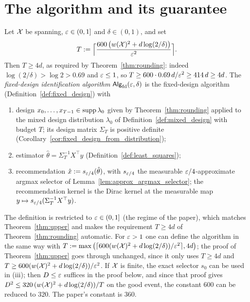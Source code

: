 \section{The algorithm and its guarantee}
\label{sec:upper_theorem}

\begin{definition}\label{def:fixed_design_algorithm}
\leanok
{}
Let $\mathcal{X}$ be spanning, $\varepsilon \in (0,1]$ and $\delta \in (0,1)$, and set
\[
  T := \Big\lceil \frac{600\,\big(w(\mathcal{X})^2 + d\log(2/\delta)\big)}{\varepsilon^2} \Big\rceil .
\]
Then $T \ge 4d$, as required by Theorem~\ref{thm:rounding}: indeed $\log(2/\delta) > \log 2 > 0.69$
and $\varepsilon \le 1$, so $T \ge 600\cdot0.69\,d/\varepsilon^2 \ge 414\,d \ge 4d$.
The \emph{fixed-design identification algorithm} $\mathsf{Alg}_{\mathrm{fd}}(\varepsilon,\delta)$
is the fixed-design algorithm (Definition~\ref{def:fixed_design}) with
\begin{enumerate}
  \item[(i)] design $x_0,\dots,x_{T-1} \in \operatorname{supp}\lambda_0$ given by Theorem~\ref{thm:rounding}
        applied to the mixed design distribution $\lambda_0$ of Definition~\ref{def:mixed_design}
        with budget $T$; its design matrix $\Sigma_T$ is positive definite
        (Corollary~\ref{cor:fixed_design_from_distribution});
  \item[(ii)] estimator $\hat\theta = \Sigma_T^{-1}X^\top y$ (Definition~\ref{def:least_squares});
  \item[(iii)] recommendation $\hat{x} := s_{\varepsilon/4}(\hat\theta)$, with $s_{\varepsilon/4}$ the measurable
        $\varepsilon/4$-approximate argmax selector of Lemma~\ref{lem:approx_argmax_selector}; the
        recommendation kernel is the Dirac kernel at the measurable map $y \mapsto
        s_{\varepsilon/4}(\Sigma_T^{-1}X^\top y)$.
\end{enumerate}
\end{definition}

\begin{remark}\label{rem:upper_eps_range}
The definition is restricted to $\varepsilon \in (0,1]$ (the regime of the paper), which matches
Theorem~\ref{thm:upper} and makes the requirement $T \ge 4d$ of Theorem~\ref{thm:rounding}
automatic. For $\varepsilon > 1$ one can define the algorithm in the same way with
$T := \max\big(\lceil 600(w(\mathcal{X})^2 + d\log(2/\delta))/\varepsilon^2\rceil, 4d\big)$; the proof of
Theorem~\ref{thm:upper} goes through unchanged, since it only uses $T \ge 4d$ and
$T \ge 600(w(\mathcal{X})^2 + d\log(2/\delta))/\varepsilon^2$. If $\mathcal{X}$ is finite, the exact selector $s_0$
can be used in (iii); then $D \le \varepsilon$ suffices in the proof below, and since that proof gives
$D^2 \le 320\,(w(\mathcal{X})^2 + d\log(2/\delta))/T$ on the good event, the constant $600$ can be
reduced to $320$. The paper's constant is $360$.
\end{remark}

